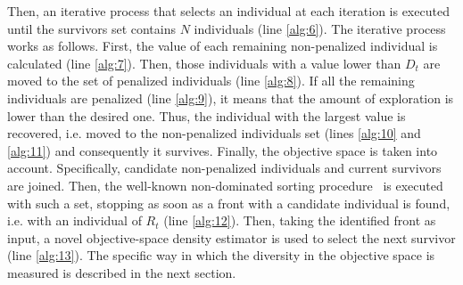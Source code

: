 Then, an iterative process that selects an individual at each iteration is executed until the survivors
set contains $N$ individuals (line \ref{alg:6}).
%
The iterative process works as follows.
%
First, the \DCS{} value of each remaining non-penalized individual is calculated (line \ref{alg:7}).
%
Then, those individuals with a \DCS{} value lower than $D_t$ are moved to the set of penalized individuals (line \ref{alg:8}).
%
If all the remaining individuals are penalized (line \ref{alg:9}), it means that the amount of exploration is lower than the
desired one.
%
Thus, the individual with the largest \DCS{} value is recovered, i.e. moved to the non-penalized individuals 
set (lines \ref{alg:10} and \ref{alg:11}) and consequently it survives.
%
Finally, the objective space is taken into account.
%
Specifically, candidate non-penalized individuals and current survivors are joined.
%
Then, the well-known non-dominated sorting procedure~\cite{Joel:NSGAII} is executed with such a set, stopping as soon as a front with 
a candidate individual is found, i.e. with an individual of $R_t$ (line \ref{alg:12}).
%
Then, taking the identified front as input, a novel objective-space density estimator is used to select
the next survivor (line \ref{alg:13}).
%
The specific way in which the diversity in the objective space is measured is described in the next section.
%

%


%
%
%

%
%
%

